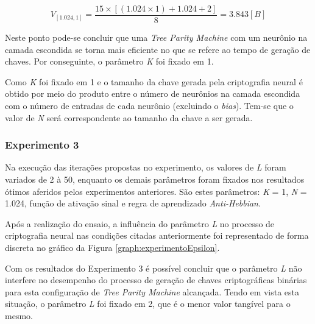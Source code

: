 \documentclass[12pt]{article}
\begin{document}
                \begin{equation}
                    \label{eq:dataVol1.024_1}
                    V_{[1.024, 1]} = \frac{15 \times [(1.024 \times 1) + 1.024 + 2]}{8} = 3.843 [B]
                \end{equation}

                Neste ponto pode-se concluir que uma \textit{Tree Parity Machine} com um neurônio na camada escondida se torna mais eficiente no que se refere ao tempo de geração de chaves. Por conseguinte, o parâmetro \textit{K} foi fixado em 1.
                
                Como \textit{K} foi fixado em 1 e o tamanho da chave gerada pela criptografia neural é obtido por meio do produto entre o número de neurônios na camada escondida com o número de entradas de cada neurônio (excluindo o \textit{bias}). Tem-se que o valor de \textit{N} será correspondente ao tamanho da chave a ser gerada.
                
            \subsubsection{Experimento 3}
            \label{subsubsec:experimentoEpsilon}

                Na execução das iterações propostas no experimento, os valores de \textit{L} foram variados de 2 à 50, enquanto os demais parâmetros foram fixados nos resultados ótimos aferidos pelos experimentos anteriores. São estes parâmetros: \textit{K} = 1, \textit{N} = 1.024, função de ativação sinal e regra de aprendizado \textit{Anti-Hebbian}.
                
                Após a realização do ensaio, a influência do parâmetro \textit{L} no processo de criptografia neural nas condições citadas anteriormente foi representado de forma discreta no gráfico da Figura \ref{graph:experimentoEpsilon}.

                
                
                Com os resultados do Experimento 3 é possível concluir que o parâmetro \textit{L} não interfere no desempenho do processo de geração de chaves criptográficas binárias para esta configuração de \textit{Tree Parity Machine} alcançada. Tendo em vista esta situação, o parâmetro \textit{L} foi fixado em 2, que é o menor valor tangível para o mesmo.
            
\end{document}
